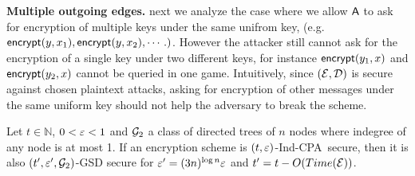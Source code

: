 \documentclass{article}
\newcommand{\tcpa}{$(t,\eps)$-Ind-CPA}
\def\A{{\sf A}}
\def\E{{\cal E}}
\def\D{{\cal D}}
\newcommand{\encrypt}{{\sf encrypt}}
\begin{document}
\textbf{Multiple outgoing edges.} next we analyze the case where we allow $\A$ to ask for encryption of multiple keys under the same unifrom key, (e.g. $\encrypt(y,x_1), \encrypt(y,x_2), \cdots.)$. However the attacker still cannot ask for the encryption of a single key under two different keys, for instance $\encrypt(y_1,x)$ and$ \encrypt(y_2,x)$ cannot be queried in one game. Intuitively, since $(\E,\D)$ is secure against chosen plaintext attacks, asking for encryption of other messages under the same uniform key should not help the adversary to break the scheme. 

\begin{theorem}\label{thm:1in-Mout}
Let $t \in \mathbb{N}$, $0<\varepsilon<1$ and ${\cal G}_2$ a class of directed trees of $n$ nodes where indegree of any node is at most 1. If an encryption scheme is \tcpa~secure, then it is also $(t',\varepsilon',{\cal G}_2)$-GSD secure for $\varepsilon'=(3n)^{\log n} \varepsilon$ and $t'=t-O(Time(\E))$.
\end{theorem}
\end{document}
